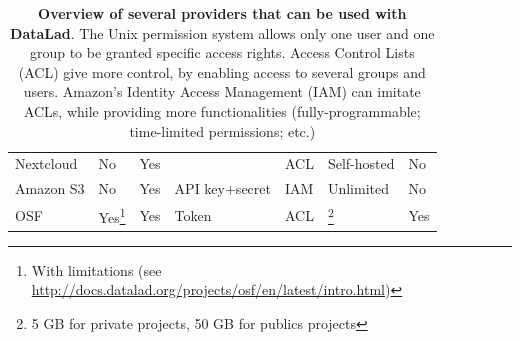 \documentclass[smallextended]{svjour3}       %
\makeatletter
\newcommand\footnoteref[1]{\protected@xdef\@thefnmark{\ref{#1}}\@footnotemark}
\makeatother
\begin{document}
\begin{table}[ht]
\begin{minipage}{\columnwidth}
\begin{tabular}{@{}lllllll@{}}
Nextcloud                             & No                               & Yes                                      &                                             & ACL                                      & Self-hosted & No                                 \\
Amazon S3                             & No                               & Yes                                      & API key+secret                              & IAM                                      & Unlimited & No                                  \\
OSF                                   & Yes\footnote{\label{osf}With limitations (see \url{http://docs.datalad.org/projects/osf/en/latest/intro.html})}                             & Yes\footnoteref{osf}                                     & Token                                       & ACL                                      & \footnote{5 GB for private projects, 50 GB for publics projects}  & Yes                              \\                                 
\end{tabular}
\end{minipage}
\caption{\label{table:providers}\textbf{Overview of several providers that can be used with DataLad}. The Unix permission system allows only one user and one group to be granted specific access rights. Access Control Lists (ACL) give more control, by enabling access to several groups and users. Amazon's Identity Access Management (IAM) can imitate ACLs, while providing more functionalities (fully-programmable; time-limited permissions; etc.) }
\end{table}
\end{document}
